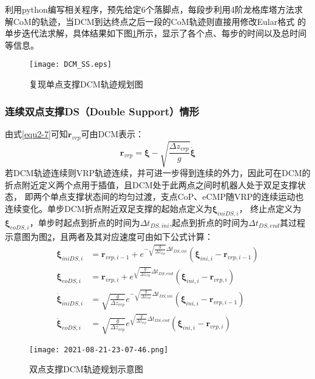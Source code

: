             利用python编写相关程序，预先给定6个落脚点，每段步利用4阶龙格库塔方法求解CoM的轨迹，当DCM到达终点之后一段的CoM轨迹则直接用修改Eular格式
            的单步迭代法求解，具体结果如下图\ref{fig2-4}所示，显示了各个点、每步的时间以及总时间等信息。
            \begin{figure}[h] 
                \centering
                \texttt{[image: DCM\_SS.eps]}
                \caption{复现单点支撑DCM轨迹规划图} \label{fig2-4}
            \end{figure}
        \subsubsection{连续双点支撑DS（Double Support）情形}
            由式\eqref{equ2-7}可知$\boldsymbol{r}_{vrp}$可由DCM表示：
            \begin{equation}
                \boldsymbol{r}_{vrp}=\boldsymbol{\xi }-\sqrt{\frac{\varDelta z_{vrp}}{g}}\boldsymbol{\dot{\xi}}
                \label{equ2-13}
            \end{equation}
            若DCM轨迹连续则VRP轨迹连续，并可进一步得到连续的外力，因此可在DCM的折点附近定义两个点用于插值，且DCM处于此两点之间时机器人处于双足支撑状态，
            即两个单点支撑状态间的均匀过渡，支点CoP、eCMP随VRP的连续运动也连续变化。单步DCM折点附近双足支撑的起始点定义为$\boldsymbol{\xi}_{iniDS,i}$，
            终止点定义为$\boldsymbol{\xi}_{eoDS,i}$，单步时起点到折点的时间为$\varDelta t_{DS,ini}$,起点到折点的时间为$\varDelta t_{DS,end}$其过程
            示意图为图\ref{fig2-5}，且两者及其对应速度可由如下公式计算：
            \begin{subequations}
                \begin{align}
                    \boldsymbol{\xi }_{iniDS,i}&=\boldsymbol{r}_{vrp,i-1}+e^{-\sqrt{\frac{g}{\varDelta z_{vrp}}}\varDelta t_{DS,ini}}\left( \boldsymbol{\xi }_{ini,i}-\boldsymbol{r}_{vrp,i-1} \right) 
                    \label{equ2-14a}\\
                    \boldsymbol{\xi }_{eoDS,i}&=\boldsymbol{r}_{vrp,i}+e^{\sqrt{\frac{g}{\varDelta z_{vrp}}}\varDelta t_{DS,end}}\left( \boldsymbol{\xi }_{ini,i}-\boldsymbol{r}_{vrp,i} \right) 
                    \label{equ2-14b}\\
                    \boldsymbol{\dot{\xi}}_{iniDS,i}&=\sqrt{\frac{g}{\varDelta z_{vrp}}}e^{-\sqrt{\frac{g}{\varDelta z_{vrp}}}\varDelta t_{DS,ini}}\left( \boldsymbol{\xi }_{ini,i}-\boldsymbol{r}_{vrp,i-1} \right) 
                    \label{equ2-14c}\\
                    \boldsymbol{\dot{\xi}}_{eoDS,i}&=\sqrt{\frac{g}{\varDelta z_{vrp}}}e^{\sqrt{\frac{g}{\varDelta z_{vrp}}}\varDelta t_{DS,end}}\left( \boldsymbol{\xi }_{ini,i}-\boldsymbol{r}_{vrp,i} \right) 
                    \label{equ2-14d}
                \end{align}
            \end{subequations}
            \begin{figure}[h] 
                \centering
                \texttt{[image: 2021-08-21-23-07-46.png]}
                \caption{双点支撑DCM轨迹规划示意图} \label{fig2-5}
            \end{figure}

